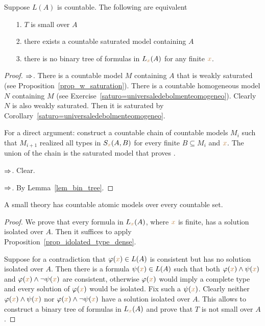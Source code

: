 \begin{proposition}\label{prop_small_equivalents}
Suppose $L(A)$ is countable.
The following are equivalent\nobreak
\begin{itemize}   
\item[1.] $T$ is small over $A$
\item[2.] there exists a countable saturated model containing $A$
\item[3.] there is no binary tree of formulas in $L_{\color{brown} x}(A)$ for any finite ${\color{brown} x}$.
\end{itemize}
\end{proposition}
\begin{proof}$\Rightarrow$. There is a countable model $M$ containing $A$ that is weakly saturated (see Proposition~\ref{prop_w_saturation}).
There is a countable homogeneous model $N$ containing $M$ (see Exercise~\ref{saturo=universaledebolmenteomogeneo}).
Clearly $N$ is also weakly saturated.
Then it is saturated by Corollary~\ref{saturo=universaledebolmenteomogeneo}.

For a direct argument: construct a countable chain of countable models $M_i$ such that $M_{i+1}$ realized all types in $S_{\color{brown} x}(A,B)$ for every finite $B\subseteq M_i$ and ${\color{brown} x}$.
The union of the chain is the saturated model that proves .


$\Rightarrow$. Clear.

$\Rightarrow$. By Lemma~\ref{lem_bin_tree}.
\end{proof}


\begin{proposition} 
A small theory has countable atomic models over every countable set.
\end{proposition}
\begin{proof}
We prove that every formula in $L_{\color{brown} x}(A)$, where ${\color{brown} x}$ is finite, has a solution isolated over $A$.
Then it suffices to apply Proposition~\ref{prop_idolated_type_dense}.

Suppose for a contradiction that $\varphi({\color{brown} x})\in L(A)$ is consistent but has no solution isolated over $A$.
Then there is a formula $\psi({\color{brown} x})\in L(A)$ such that both $\varphi({\color{brown} x})\wedge\psi({\color{brown} x})$ and $\varphi({\color{brown} x})\wedge\neg\psi({\color{brown} x})$ are consistent, otherwise $\varphi({\color{brown} x})$ would imply a complete type and every solution of $\varphi({\color{brown} x})$ would be isolated.
Fix such a $\psi({\color{brown} x})$.
Clearly neither $\varphi({\color{brown} x})\wedge\psi({\color{brown} x})$ nor $\varphi({\color{brown} x})\wedge\neg\psi({\color{brown} x})$ have a solution isolated over $A$.
This allows to construct a binary tree of formulas in $L_{\color{brown} x}(A)$ and prove that $T$ is not small over $A$.
\end{proof}

